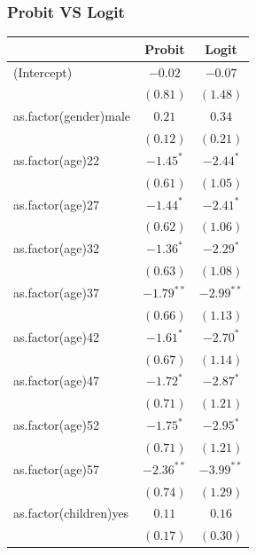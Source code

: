 \documentclass{beamer}
\newcommand{\1}{\mathbb{1}}
\begin{document}
\begin{frame}\frametitle{Probit VS Logit}

\begin{table}[hb!]
\tiny
\begin{center}
\begin{tabular}{l c c }
\toprule
 & Probit & Logit \\
\midrule
(Intercept)                  & $-0.02$      & $-0.07$      \\
                             & $(0.81)$     & $(1.48)$     \\
as.factor(gender)male        & $0.21$       & $0.34$       \\
                             & $(0.12)$     & $(0.21)$     \\
as.factor(age)22             & $-1.45^{*}$  & $-2.44^{*}$  \\
                             & $(0.61)$     & $(1.05)$     \\
as.factor(age)27             & $-1.44^{*}$  & $-2.41^{*}$  \\
                             & $(0.62)$     & $(1.06)$     \\
as.factor(age)32             & $-1.36^{*}$  & $-2.29^{*}$  \\
                             & $(0.63)$     & $(1.08)$     \\
as.factor(age)37             & $-1.79^{**}$ & $-2.99^{**}$ \\
                             & $(0.66)$     & $(1.13)$     \\
as.factor(age)42             & $-1.61^{*}$  & $-2.70^{*}$  \\
                             & $(0.67)$     & $(1.14)$     \\
as.factor(age)47             & $-1.72^{*}$  & $-2.87^{*}$  \\
                             & $(0.71)$     & $(1.21)$     \\
as.factor(age)52             & $-1.75^{*}$  & $-2.95^{*}$  \\
                             & $(0.71)$     & $(1.21)$     \\
as.factor(age)57             & $-2.36^{**}$ & $-3.99^{**}$ \\
                             & $(0.74)$     & $(1.29)$     \\
as.factor(children)yes       & $0.11$       & $0.16$       \\
                             & $(0.17)$     & $(0.30)$     \\

\end{tabular}
\end{center}
\end{table}
\end{frame}
\end{document}
